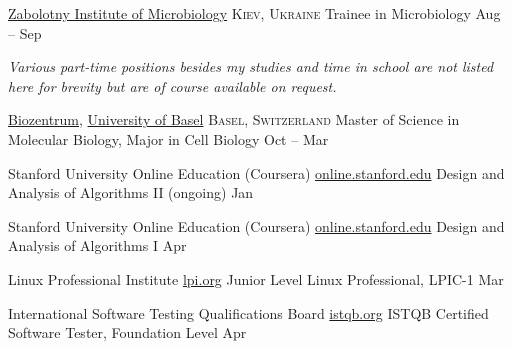\documentclass[10pt,a4paper]{article}
\begin{document}
\headedsection
  {\href{http://www.imv.kiev.ua/}{Zabolotny Institute of Microbiology}}
  {\textsc{Kiev, Ukraine}} {%
  \headedsubsection
    {Trainee in Microbiology}
    {Aug  -- Sep }
    {}
}

\begin{center}
  \emph{Various part-time positions besides my studies and time in school are not listed here for brevity but are of course available on request.} 
\end{center}


\spacedhrule{-0.2em}{-0.4em}


\headedsection
  {\href{http://www.biozentrum.unibas.ch/}{Biozentrum}, \href{http://unibas.ch/}{University of Basel}}
  {\textsc{Basel, Switzerland}} {%
  \headedsubsection
    {Master of Science in Molecular Biology, Major in Cell Biology}
    {Oct  -- Mar }
    {}
}

\spacedhrule{0.5em}{-0.4em}


\headedsection
  {Stanford University Online Education (Coursera)}
  {\href{http://online.stanford.edu/courses}{online.stanford.edu}} {%
  \headedsubsection
    {Design and Analysis of Algorithms II (ongoing)}
    {Jan }
    {\bodytext{}}
}

\headedsection
  {Stanford University Online Education (Coursera)}
  {\href{http://online.stanford.edu/courses}{online.stanford.edu}} {%
  \headedsubsection
    {Design and Analysis of Algorithms I}
    {Apr }
    {\bodytext{}}
}

\headedsection
  {Linux Professional Institute}
  {\href{https://www.lpi.org/linux-certifications/programs}{lpi.org}} {%
  \headedsubsection
    {Junior Level Linux Professional, LPIC-1}
    {Mar }
    {\bodytext{}}
}

\headedsection
  {International Software Testing Qualifications Board}
  {\href{http://www.istqb.org/certification-path-root/foundation-level/foundation-level-content.html}{istqb.org}} {%
  \headedsubsection
    {ISTQB Certified Software Tester,  Foundation Level}
    {Apr }
    {\bodytext{}}
}
\end{document}
